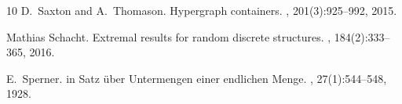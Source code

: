 \documentclass[12pt]{article}
\begin{document}
\begin{thebibliography}{10}
D.~Saxton and A.~Thomason.
\newblock Hypergraph containers.
, 201(3):925--992, 2015.

Mathias Schacht.
\newblock Extremal results for random discrete structures.
, 184(2):333--365, 2016.

E.~Sperner.
in {S}atz {\"u}ber {U}ntermengen einer endlichen {M}enge.
, 27(1):544--548, 1928.

\end{thebibliography}
\end{document}

